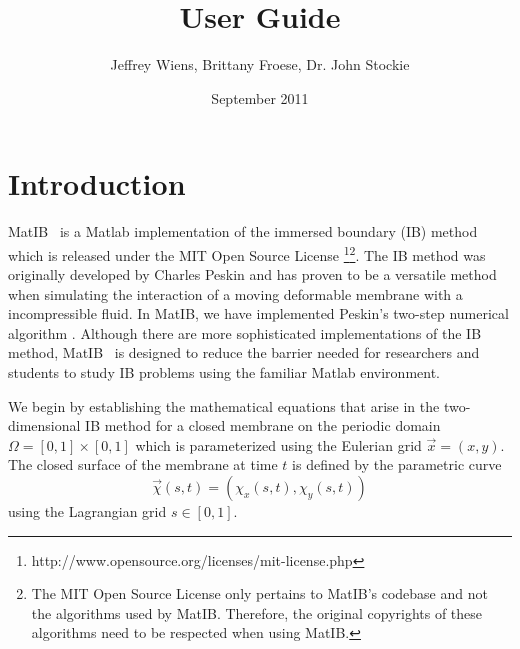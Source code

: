 \documentclass{article}
\title{User Guide}
\author{Jeffrey Wiens, Brittany Froese, Dr. John Stockie}
\date{September 2011}
\newcommand{\softwarename}{MatIB}
\begin{document}
\maketitle

\section{Introduction}\label{sec:intro}

\softwarename~ is a Matlab implementation of the immersed boundary (IB) method which is released under the MIT Open Source 
License \footnote{http://www.opensource.org/licenses/mit-license.php}\footnote{The MIT Open Source License only pertains to \softwarename 's codebase and not the algorithms used by \softwarename. Therefore, the original copyrights of these algorithms need to be respected when using \softwarename.}. The IB method was originally developed by Charles Peskin \cite{PeskinHearts} and has proven
to be a versatile method when simulating the interaction of a moving deformable membrane with a incompressible fluid. In \softwarename, we have implemented 
 Peskin's two-step numerical algorithm \cite{PeskinIB}. Although there are more sophisticated implementations of the IB method,
\softwarename~ is designed to reduce the barrier needed for researchers and students to study IB problems using the familiar Matlab environment.

We begin by establishing the mathematical equations that arise in the two-dimensional IB method for a closed membrane on the periodic domain 
$\Omega = [0,1]\times[0,1]$ which is parameterized using the Eulerian grid $\vec{x} = (x,y)$.  
The closed surface of the membrane at time $t$ is defined by the parametric curve
\[ \vec{\chi}(s,t) = (\chi_x(s,t),\chi_y(s,t)) \]
using the Lagrangian grid $s \in [0,1]$.
\end{document}
